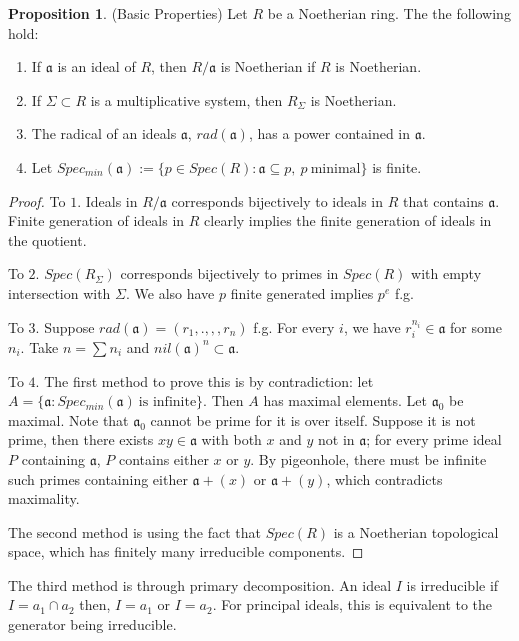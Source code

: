 \documentclass{article}
\theoremstyle{definition}
\theoremstyle{definition}
\theoremstyle{definition}
\newtheorem{proposition}{Proposition}[section]
\theoremstyle{definition}
\theoremstyle{definition}
\theoremstyle{definition}
\theoremstyle{definition}
\begin{document}
\begin{tcolorbox}[colback=blue!5!white,colframe=blue!30!white]
\begin{proposition}
(Basic Properties) Let $R$ be a Noetherian ring. The the following hold: 
\begin{enumerate}
    \item If $\mathfrak{a}$ is an ideal of $R$, then $R/\mathfrak{a}$ is Noetherian if $R$ is Noetherian.
    \item If $\Sigma\subset R$ is a multiplicative system, then $R_{\Sigma}$ is Noetherian. 
    \item The radical of an ideals $\mathfrak{a}$, $rad(\mathfrak{a})$, has a power contained in $\mathfrak{a}$.
    \item  Let $Spec_{min}(\mathfrak{a}):=\{ p\in Spec(R): \mathfrak{a}\subseteq p, \ p \ \textrm{minimal}  \}$ is finite.
\end{enumerate}
\end{proposition}
\end{tcolorbox}
\begin{proof}
    To $1$. Ideals in $R/\mathfrak{a}$ corresponds bijectively to ideals in $R$ that contains $\mathfrak{a}$. Finite generation of ideals in $R$ clearly implies the finite generation of ideals in the quotient. 

    To $2$. $Spec(R_{\Sigma})$ corresponds bijectively to primes in $Spec(R)$ with empty intersection with $\Sigma$. We also have $p$ finite generated implies $p^e$ f.g.

    To $3$. Suppose $rad(\mathfrak{a})=(r_1,.,,,r_n)$ f.g. For every $i$, we have $r_i^{n_i}\in \mathfrak{a}$ for some $n_i$. Take $n=\sum n_i$ and $nil(\mathfrak{a})^{n}\subset \mathfrak{a}$. 
    
    To $4$. The first method to prove this is by contradiction: let $A=\{ \mathfrak{a}: Spec_{min}(\mathfrak{a}) \ \textrm{is infinite} \}$. Then $A$ has maximal elements. Let $\mathfrak{a_0}$ be maximal. Note that $\mathfrak{a_0}$ cannot be prime for it is over itself. Suppose it is not prime, then there exists $xy\in \mathfrak{a}$ with both $x$ and $y$ not in $\mathfrak{a}$; for every prime ideal $P$ containing $\mathfrak{a}$, $P$ contains either $x$ or $y$. By pigeonhole, there must be infinite such primes containing either $\mathfrak{a}+(x)$ or $\mathfrak{a}+(y)$, which contradicts maximality. 

    The second method is using the fact that $Spec(R)$ is a Noetherian topological space, which has finitely many irreducible components.

\end{proof}
The third method is through primary decomposition. An ideal $I$ is irreducible if $I=a_1\cap a_2$ then, $I=a_1$ or $I=a_2$. For principal ideals, this is equivalent to the generator being irreducible. 
\end{document}
